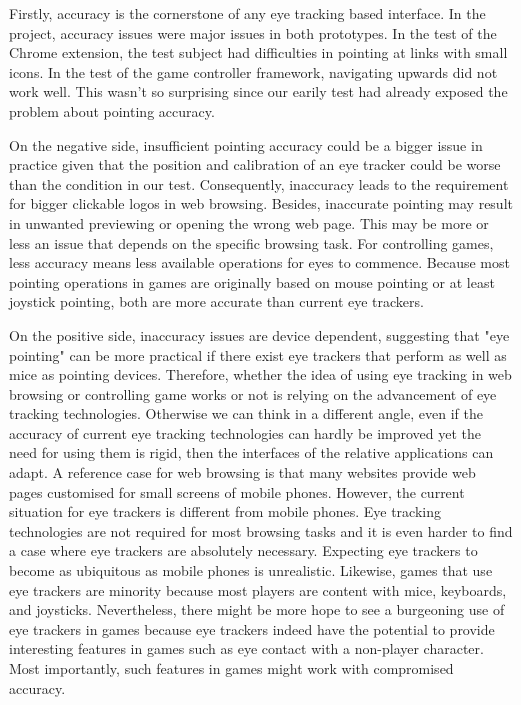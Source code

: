 \documentclass[english]{tktltiki}
\begin{document}
Firstly, accuracy is the cornerstone of any eye tracking based interface. In the project, accuracy issues were major issues in both prototypes. In the test of the Chrome extension, the test subject had difficulties in pointing at links with small icons. In the test of the game controller framework, navigating upwards did not work well. This wasn't so surprising since our earily test had already exposed the problem about pointing accuracy. 

On the negative side, insufficient pointing accuracy could be a bigger issue in practice given that the position and calibration of an eye tracker could be worse than the condition in our test. Consequently, inaccuracy leads to the requirement for bigger clickable logos in web browsing. Besides, inaccurate pointing may result in unwanted previewing or opening the wrong web page. This may be more or less an issue that depends on the specific browsing task. For controlling games, less accuracy means less available operations for eyes to commence. Because most pointing operations in games are originally based on mouse pointing or at least joystick pointing, both are more accurate than current eye trackers.

On the positive side, inaccuracy issues are device dependent, suggesting that "eye pointing" can be more practical if there exist eye trackers that perform as well as mice as pointing devices. Therefore, whether the idea of using eye tracking in web browsing or controlling game works or not is relying on the advancement of eye tracking technologies. Otherwise we can think in a different angle, even if the accuracy of current eye tracking technologies can hardly be improved yet the need for using them is rigid, then the interfaces of the relative applications can adapt. A reference case for web browsing is that many websites provide web pages customised for small screens of mobile phones. However, the current situation for eye trackers is different from mobile phones. Eye tracking technologies are not required for most browsing tasks and it is even harder to find a case where eye trackers are absolutely necessary. Expecting eye trackers to become as ubiquitous as mobile phones is unrealistic. Likewise, games that use eye trackers are minority because most players are content with mice, keyboards, and joysticks. Nevertheless, there might be more hope to see a burgeoning use of eye trackers in games because eye trackers indeed have the potential to provide interesting features in games such as eye contact with a non-player character. Most importantly, such features in games might work with compromised accuracy.
\end{document}
